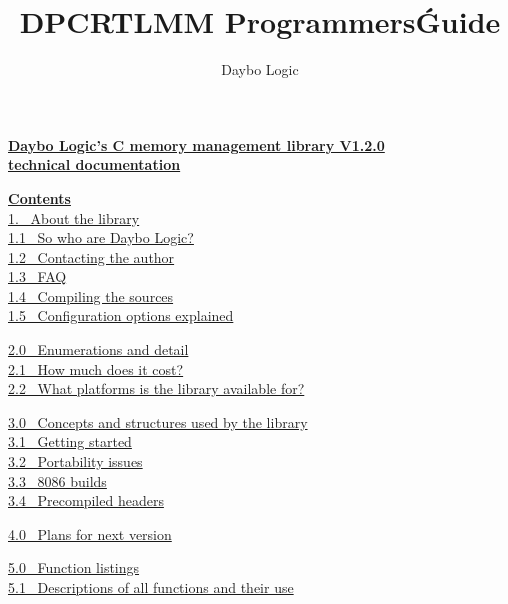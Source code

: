 \documentclass{article}
\begin{document}
\title{DPCRTLMM Programmers\' Guide}\author{Daybo Logic}
\maketitle
\newpage
\textbf{\underline{Daybo Logic's C memory management library
V1.2.0}}
\\
\textbf{\underline{technical documentation}}
\par \textbf{\underline{Contents}}
\\
\href{#About}{1.~ About the library}
\\
\href{#Who}{1.1~ So who are Daybo Logic?}
\\
\href{#Contact}{1.2~ Contacting the author}
\\
\href{#FAQ}{1.3~ FAQ}
\\
\href{#Compile}{1.4~ Compiling the sources}
\\
\href{#Config}{1.5~ Configuration options explained}

\par \href{#Enumerations}{2.0~ Enumerations and detail}\\
\href{#Cost}{2.1~ How much does it cost?}
\\
\href{#Platforms}{2.2~ What platforms is the library available
for?}

\par \href{#Concepts}{3.0~ Concepts and structures used by the
library}
\\
\href{#Starting}{3.1~ Getting started}
\\
\href{#Portability}{3.2~ Portability issues}
\\
\href{#8086}{3.3~ 8086 builds}
\\
\href{#PCH}{3.4~ Precompiled headers}

\href{#Plans}{4.0~ Plans for next version}

\par \href{#Listings}{5.0~ Function listings}
\\
\href{#FuncDescs}{5.1~ Descriptions of all functions and their
use}
\\
\end{document}
